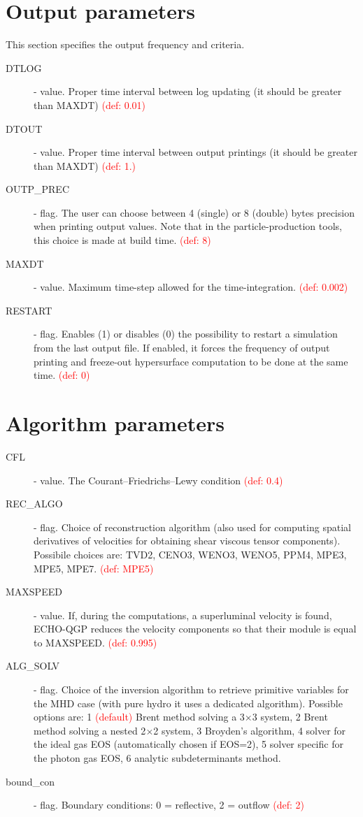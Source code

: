 \section{Output parameters}
This section specifies the output frequency and criteria.
\begin{description}
\item[DTLOG] \real - value. Proper time interval between log updating (it should be greater than MAXDT) \textcolor{red}{(def: 0.01)}
\item[DTOUT] \real - value. Proper time interval between output printings (it should be greater than MAXDT) \textcolor{red}{(def: 1.)}
\item[OUTP\_PREC] \integer - flag. The user can choose between 4 (single) or 8 (double) bytes precision when printing output values. Note that in the particle-production tools, this choice is made at build time. \textcolor{red}{(def: 8)}
\item[MAXDT] \real - value. Maximum time-step allowed for the time-integration. \textcolor{red}{(def: 0.002)}
\item[RESTART] \integer - flag. Enables (1) or disables (0) the possibility to restart a simulation from the last output file. If enabled, it forces the frequency of output printing and freeze-out hypersurface computation to be done at the same time. \textcolor{red}{(def: 0)}
\end{description}

\section{Algorithm parameters}
\begin{description}
\item[CFL] \real - value. The Courant–Friedrichs–Lewy condition \textcolor{red}{(def: 0.4)}
\item[REC\_ALGO] \chara - flag. Choice of reconstruction algorithm (also used for computing spatial derivatives of velocities for obtaining shear viscous tensor components). Possibile choices are: TVD2, CENO3, WENO3, WENO5, PPM4, MPE3, MPE5, MPE7. \textcolor{red}{(def: MPE5)}
\item[MAXSPEED] \real - value. If, during the computations, a superluminal velocity is found, ECHO-QGP reduces the velocity components so that their module is equal to MAXSPEED. \textcolor{red}{(def: 0.995)}
\item[ALG\_SOLV] \integer - flag. Choice of the inversion algorithm to retrieve primitive variables for the MHD case (with pure hydro it uses a dedicated algorithm). Possible options are: 1 \textcolor{red}{(default)} Brent method solving a 3$\times$3 system, 2 Brent method solving a nested 2$\times$2 system, 3 Broyden's algorithm, 4 solver for the ideal gas EOS (automatically chosen if EOS=2), 5 solver specific for the photon gas EOS, 6 analytic subdeterminants method.
\item [bound\_con] \integer - flag. Boundary conditions: 0 = reflective, 2 = outflow \textcolor{red}{(def: 2)}
\end{description}

